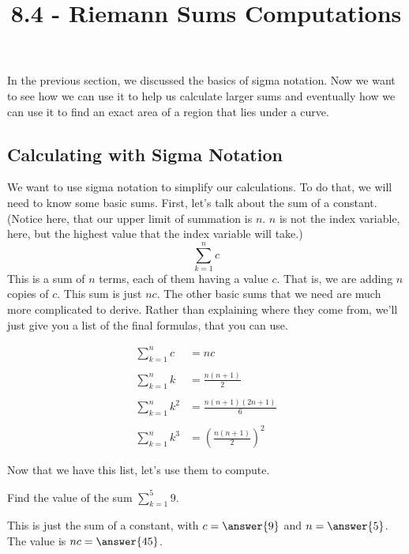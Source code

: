 \documentclass{ximera}
\title{8.4 - Riemann Sums Computations}
\begin{document}
\begin{abstract}
	
\end{abstract}
\maketitle
In the previous section, we discussed the basics of sigma notation. Now we want to see how we can use it to help us calculate larger sums and eventually how we can use it to find an exact area of a region that lies under a curve.

\subsection{Calculating with Sigma Notation}
 We want to use sigma notation to simplify our calculations.  To do that, we will need to know some basic sums.  
 First, let's talk about the sum of a constant.  (Notice here, that our upper limit of summation is $n$.  $n$ is not the index 
 variable, here, but the highest value that the index variable will take.)
 \[ \sum_{k=1}^n c \] 
 This is a sum of $n$ terms, each of them having a value $c$.  That is, we are adding $n$ copies of $c$.  This sum is just $nc$.
 The other basic sums that we need are much more complicated to derive.  Rather than explaining where they come from, we'll just give you
 a list of the final formulas, that you can use.
 
 \begin{align*}
	\sum_{k=1}^n c &= nc \\ \\
	\sum_{k=1}^n k &= \frac{n(n+1)}{2} \\ \\
	\sum_{k=1}^n k^2 &= \frac{n(n+1)(2n+1)}{6} \\ \\
	\sum_{k=1}^n k^3 &= \left(\frac{n(n+1)}{2}\right)^2
\end{align*} 


Now that we have this list, let's use them to compute.
\begin{example}
	Find the value of the sum $\displaystyle \sum_{k=1}^{5} 9$.
	\begin{explanation}
		This is just the sum of a constant, with $c=\answer{9}$ and $n=\answer{5}$.  The value is $nc=\answer{45}$.	
	\end{explanation}
\end{example}

 
\end{document}
